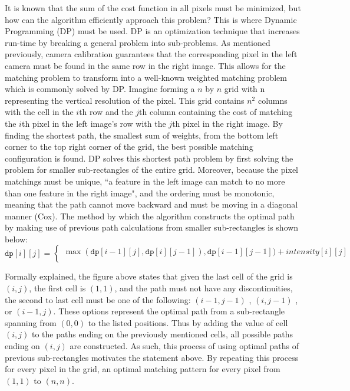 \documentclass[11pt]{scrartcl}
\begin{document}
It is known that the sum of the cost function in all pixels must be minimized, but how can 
the algorithm efficiently approach this problem? This is where Dynamic Programming (DP)
must be used. DP is an optimization technique that increases run-time by breaking a general problem into sub-problems.  As mentioned previously, camera calibration guarantees that the corresponding 
pixel in the left camera must be found in the same row in the right image. This allows for the matching problem to transform into a well-known weighted matching problem which is commonly solved by DP. Imagine forming a $n$ by $n$ grid with n representing the vertical resolution of the pixel. This grid contains $n^2$ columns with the cell in the 
$i$th row and the $j$th column containing the cost of matching the $i$th pixel in the left image's row with the $j$th pixel in the right image. By finding the shortest path, the smallest sum of weights, from the bottom left corner to the top right corner of the grid, the best possible matching configuration is found. DP solves this shortest path problem 
by first solving the problem for smaller sub-rectangles of the entire grid. Moreover, because the pixel matchings must be unique, ``a feature in the left image can match to no more than one feature in the right image", and the ordering must be monotonic, meaning that the path cannot move backward and must be moving in a diagonal manner (Cox). The method by which the algorithm constructs the optimal path by making use of previous path calculations from smaller sub-rectangles is shown below: 
\[
    \texttt{dp}[i][j] =
\begin{cases}
    \max(\texttt{dp}[i-1][j], \texttt{dp}[i][j-1]), \texttt{dp}[i-1][j-1]) + intensity[i][j] \\

\end{cases}
\]
\begin{remark}
    Formally explained, the figure above states that given the last cell of the grid 
    is $(i,j)$, the first cell is $(1,1)$, and the path must not have any discontinuities, 
    the second to last cell must be one of the following: $(i-1, j-1)$ , $(i, j-1)$ , or 
    $(i-1, j)$. These options represent the optimal path from a sub-rectangle spanning from $(0,0)$
    to the listed positions. Thus by adding the value of cell $(i, j)$ to the paths ending on the previously mentioned cells, all possible paths ending on $(i,j)$ are constructed. As such, this process of using optimal paths of previous sub-rectangles motivates the statement above. By repeating 
    this process for every pixel in the grid, an optimal matching pattern for every pixel from 
    $(1,1)$ to $(n,n)$. 
\end{remark}
\end{document}
